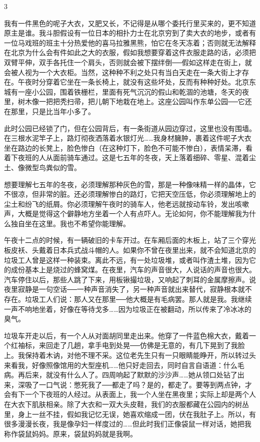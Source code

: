 3 

我有一件黑色的呢子大衣，又肥又长，不记得是从哪个委托行里买来的，更不知道原主是谁。我斗胆假设有一位日本的相扑力士在北京穷到了卖大衣的地步，或者有一位马戏班的班主十分热爱他的喜马拉雅黑熊，怕它在冬天冻着；否则就无法解释在北京为什么会有件如此之大的衣服，假如我想要穿着这件衣服走路的话，必须把双臂平伸，双手各托住一个肩头，否则就会被下摆绊倒──假如这样走在街上，就会被人视为一个大衣柜。当然，这种种不利之处只有当白天走在一条大街上才存在。午夜时分穿着它坐在一条长椅上，就没有这些坏处，反而有种种好处。北京东城有一座小公园，围着铁栅栏，里面有死气沉沉的假山和乾涸的池塘，冬天的夜里，树木像一把把秃扫帚，把儿朝下地栽在地上。这座公园叫作东单公园──它还在那里，只是比当年小多了。 

此时公园已经锁了门，但在公园背后，有一条街道从园边穿过，这里也没有围墙。在三根水泥竿子上，路灯彻夜洒落着水银灯光……我身材臃肿，裹着这件呢子大衣坐在路边的长凳上，脸色惨白（在这种灯下，脸色不可能不惨白），表情呆滞，看着下夜班的人从面前骑车通过。这是七五年的冬夜，天上落着细碎、零星、混着尘土、像微型鸟粪似的雪。 

想要理解七五年的冬夜，必须理解那种灰色的雪，那是一种像味精一样的晶体，它不很凉，但非常的脏。还必须理解惨白的路灯，它把天空压低，你必须理解地上的尘土和纷飞的纸屑。你必须理解午夜时的骑车人，他老远就按动车铃，发出咳嗽声，大概是觉得这个僻静地方坐着一个人有点吓人。无论如何，你不能理解我为什么独自坐在这里。我也不希望你能理解。 

午夜十二点的时候，有一辆破旧的卡车开过。在车厢后面的木板上，站了三个穿光板皮袄、头戴着日本兵式战斗帽的人。如果你不曾在夜里出来，就不会知道北京的垃圾工人曾是这样一种装束。离此不远，有一处垃圾堆，或者叫作渣土堆，因为它的成份基本上是烧过的蜂窝煤。在夜里，汽车的声音很大，人说话的声音也很大。汽车停住以后，那些人跳了下来，用板锹撮垃圾，又响起了刺耳的金属摩擦声。说夜里寂静是一句空话──一种声音消失了，另一种声音就出来替代，寂静根本就不存在。垃圾工人们说：那人又在那里──他大概是有毛病罢。那人就是我。我继续一声不响地坐着，好像在等待戈多……因为垃圾正在被翻动，所以传来了冷冰冰的臭气。 

垃圾车开走以后，有一个人从对面胡同里走出来。他穿了一件蓝色棉大衣，戴着一个红袖标，来回走了几趟，拿手电到处晃──仿佛是无意的，有几下晃到了我脸上。我保持着木讷，对他不理不采。这位老先生只有一只眼睛能睁开，所以转过头来看我，好像照像馆用的大型座机……他只好走回去，同时自言自语道：什么毛病。再后来，就没有什么人了。四周响起了默默的沙沙声……她从领口处钻了出来，深吸了一口气说：憋死我了──都走了吗？是的，都走了。要等到两点钟，才会有下一个下夜班的人经过。从表面上，我一个人坐在黑夜里；实际上却是两个人在大衣下肌肤相亲。除了大衣和一双大头皮鞋，我们的衣服都藏在公园内的树丛里，身上一丝不挂，假如我记忆无误，她喜欢缩成一团，伏在我肚子上。所以，有很多漫漫长夜，我是像孕妇一样度过的……但此时我们正像袋鼠一样对话，她把我称作袋鼠妈妈。原来，袋鼠妈妈就是我啊。 

